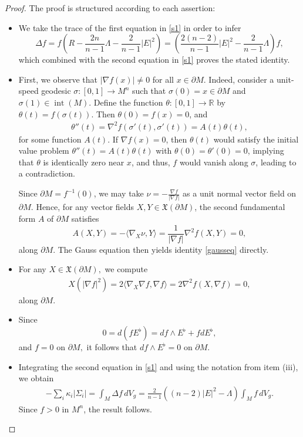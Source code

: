 \documentclass{amsart}
\numberwithin{equation}{section}
\begin{document}
	
	\begin{proof}
The proof is structured according to each assertion:
	
		\begin{itemize}
		\item[(i)] We take the trace of the first equation in \eqref{s1} in order to infer $$\Delta f= f\left(R -\frac{2n}{n-1}\Lambda -\frac{2}{n-1}|E|^2\right)=\left(\frac{2(n-2)}{n-1}|E|^2 -\frac{2}{n-1}\Lambda\right)f,$$ which combined with the second equation in \eqref{s1} proves the stated identity. 
		
		\item[(ii)] First, we observe that \( |\nabla f(x)| \neq 0 \) for all \( x \in \partial M \). Indeed, consider a unit-speed geodesic \( \sigma: [0,1] \to M^n \) such that \( \sigma(0) = x \in \partial M \) and \( \sigma(1) \in \operatorname{int}(M) \). Define the function \( \theta: [0,1] \to \mathbb{R} \) by \( \theta(t) = f(\sigma(t)) \). Then \( \theta(0) = f(x) = 0 \), and
\begin{eqnarray*}
\theta''(t) = \nabla^2 f(\sigma'(t), \sigma'(t)) = A(t)\theta(t),
\end{eqnarray*} for some function \( A(t) \). If \( \nabla f(x) = 0 \), then \( \theta(t) \) would satisfy the initial value problem \( \theta''(t) = A(t)\theta(t) \) with \(  \theta(0)=\theta'(0) = 0 \), implying that \( \theta \) is identically zero near \( x \), and thus, \( f \) would vanish along \( \sigma \), leading to a contradiction.

Since \( \partial M = f^{-1}(0) \), we may take \( \nu = -\frac{\nabla f}{|\nabla f|} \) as a unit normal vector field on \( \partial M \). Hence, for any vector fields \( X, Y \in \mathfrak{X}(\partial M) \), the second fundamental form \( A \) of \( \partial M \) satisfies
\begin{equation*} \label{Cal-A}
A(X,Y) = -\langle \nabla_{X} \nu, Y \rangle = \frac{1}{|\nabla f|} \nabla^{2} f(X,Y) = 0,
\end{equation*}
along \( \partial M \). The Gauss equation then yields identity \eqref{gausseq} directly.

		\item[(iii)] For any $X\in\mathfrak{X}(\partial M),$ we compute
		 \begin{eqnarray*}
		X(|\nabla f|^2)=2\langle\nabla_X\nabla f,\nabla f\rangle=2\nabla^2f(X,\nabla f)=0,
	\end{eqnarray*}
	along $\partial M$.
		
		\item[(iv)] Since
		$$0=d(fE^{\flat})=df\wedge E^{\flat}+fdE^{\flat},$$
		and $f=0$ on $\partial M,$ it follows that $df\wedge E^{\flat}=0$ on $\partial M$.
		\item[(v)] Integrating the second equation in  \eqref{s1} and using the notation from item (iii), we obtain
\begin{eqnarray*}
-\sum_{i} \kappa_{i} |\Sigma_{i}| = \int_{M} \Delta f \, dV_{g} = \frac{2}{n-1} \left( (n-2)|E|^{2} - \Lambda \right) \int_{M} f \, dV_{g}.
\end{eqnarray*} Since \( f > 0 \) in \( M^n \), the result follows.


\end{itemize}
\end{proof}
\end{document}
